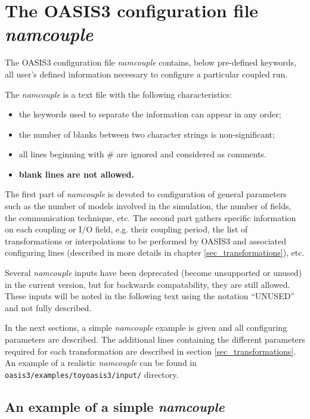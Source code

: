 \newpage
\chapter{The OASIS3 configuration file {\it namcouple}}
\label{sec_namcouple}

The OASIS3 configuration file {\it namcouple} contains, below
pre-defined keywords, all user's
defined information necessary to configure a particular coupled
run. 

The {\it namcouple} is a text file with the following
characteristics:

\begin{itemize}
\item the keywords used to separate the information
can appear in any order;
\item the number of blanks between two character strings is
non-significant; 
\item all lines beginning with \# are ignored and considered as
comments.
\item {\bf blank lines are not allowed.}
\end{itemize}

The first part of {\it namcouple } is devoted to configuration of
general parameters such as the number of models involved in the
simulation, the number of fields, the communication technique, etc.
The second part gathers specific information on each coupling or I/O
field, e.g. their coupling period, the list of transformations or
interpolations to be performed by OASIS3 and associated
configuring lines (described in more details in chapter
\ref{sec_transformations}), etc.

Several {\it namcouple} inputs have been deprecated (become unsupported
or unused) in the current version,  but for backwards compatability, they are still 
allowed.  These inputs will be noted in the following text using the
notation ``UNUSED'' and not fully described.

In the next sections, a simple {\it namcouple} example is given and
all configuring parameters are described. The additional lines
containing the different parameters required for each transformation
are described in section \ref{sec_transformations}. An example of a
realistic {\it namcouple} can be found in 
{\tt
oasis3/examples/toyoasis3/input/} directory.

\section{An example of a simple {\it namcouple}}
\label{subsec_examplenamcouple}


